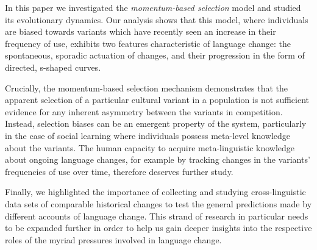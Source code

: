 In this paper we investigated the \emph{momentum-based selection} model and studied its evolutionary dynamics. Our analysis shows that this model, where individuals are biased towards variants which have recently seen an increase in their frequency of use, exhibits two features characteristic of language change: the spontaneous, sporadic actuation of changes, and their progression in the form of directed, s-shaped curves.

Crucially, the momentum-based selection mechanism demonstrates that the apparent selection of a particular cultural variant in a population is not sufficient evidence for any inherent asymmetry between the variants in competition. Instead, selection biases can be an emergent property of the system, particularly in the case of social learning where individuals possess meta-level knowledge about the variants. The human capacity to acquire meta-linguistic knowledge about ongoing language changes, for example by tracking changes in the variants' frequencies of use over time, therefore deserves further study.

Finally, we highlighted the importance of collecting and studying cross-linguistic data sets of comparable historical changes to test the general predictions made by different accounts of language change. This strand of research in particular needs to be expanded further in order to help us gain deeper insights into the respective roles of the myriad pressures involved in language change.
